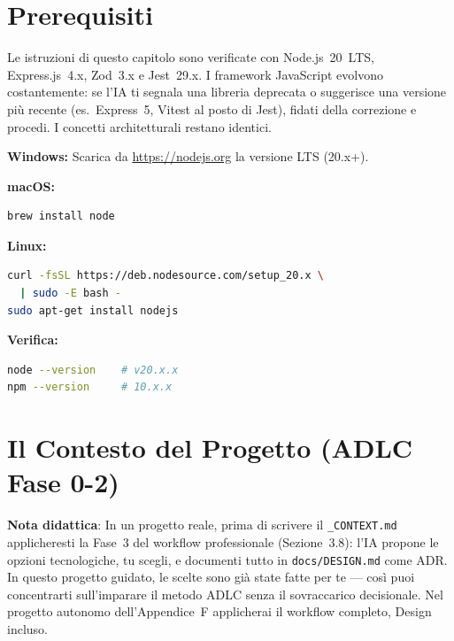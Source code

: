 \section{Prerequisiti}

\begin{versionbox}
Le istruzioni di questo capitolo sono verificate con Node.js~20~LTS, Express.js~4.x, Zod~3.x e Jest~29.x. I framework JavaScript evolvono costantemente: se l'IA ti segnala una libreria deprecata o suggerisce una versione più recente (es.\ Express~5, Vitest al posto di Jest), fidati della correzione e procedi. I concetti architetturali restano identici.
\end{versionbox}

\begin{praticabox}[title={Pratica --- Installare Node.js}]
\textbf{Windows:} Scarica da \url{https://nodejs.org} la versione LTS (20.x+).

\textbf{macOS:}
\begin{lstlisting}[language=bash]
brew install node
\end{lstlisting}

\textbf{Linux:}
\begin{lstlisting}[language=bash]
curl -fsSL https://deb.nodesource.com/setup_20.x \
  | sudo -E bash -
sudo apt-get install nodejs
\end{lstlisting}

\textbf{Verifica:}
\begin{lstlisting}[language=bash]
node --version    # v20.x.x
npm --version     # 10.x.x
\end{lstlisting}
\end{praticabox}

\section{Il Contesto del Progetto (ADLC Fase 0-2)}

\begin{notebox}
\textbf{Nota didattica}: In un progetto reale, prima di scrivere il \texttt{\_CONTEXT.md} applicheresti la Fase~3 del workflow professionale (Sezione~3.8): l'IA propone le opzioni tecnologiche, tu scegli, e documenti tutto in \texttt{docs/DESIGN.md} come ADR. In questo progetto guidato, le scelte sono già state fatte per te --- così puoi concentrarti sull'imparare il metodo ADLC senza il sovraccarico decisionale. Nel progetto autonomo dell'Appendice~F applicherai il workflow completo, Design incluso.
\end{notebox}

